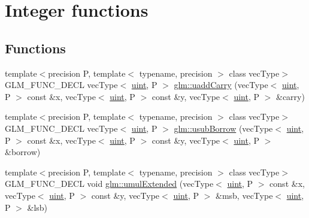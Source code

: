 \hypertarget{group__core__func__integer}{}\section{Integer functions}
\label{group__core__func__integer}
\subsection*{Functions}
\begin{DoxyCompactItemize}
\item 
{\footnotesize template$<$precision P, template$<$ typename, precision $>$ class vec\+Type$>$ }\\G\+L\+M\+\_\+\+F\+U\+N\+C\+\_\+\+D\+E\+CL vec\+Type$<$ \hyperlink{group__core__precision_ga4fd29415871152bfb5abd588334147c8}{uint}, P $>$ \hyperlink{group__core__func__integer_ga2fc1a46e7b7e9fbbd8fa444fbacaa2aa}{glm\+::uadd\+Carry} (vec\+Type$<$ \hyperlink{group__core__precision_ga4fd29415871152bfb5abd588334147c8}{uint}, P $>$ const \&x, vec\+Type$<$ \hyperlink{group__core__precision_ga4fd29415871152bfb5abd588334147c8}{uint}, P $>$ const \&y, vec\+Type$<$ \hyperlink{group__core__precision_ga4fd29415871152bfb5abd588334147c8}{uint}, P $>$ \&carry)
\item 
{\footnotesize template$<$precision P, template$<$ typename, precision $>$ class vec\+Type$>$ }\\G\+L\+M\+\_\+\+F\+U\+N\+C\+\_\+\+D\+E\+CL vec\+Type$<$ \hyperlink{group__core__precision_ga4fd29415871152bfb5abd588334147c8}{uint}, P $>$ \hyperlink{group__core__func__integer_ga22a889bf08313b7e547e2cdb8bb15ee4}{glm\+::usub\+Borrow} (vec\+Type$<$ \hyperlink{group__core__precision_ga4fd29415871152bfb5abd588334147c8}{uint}, P $>$ const \&x, vec\+Type$<$ \hyperlink{group__core__precision_ga4fd29415871152bfb5abd588334147c8}{uint}, P $>$ const \&y, vec\+Type$<$ \hyperlink{group__core__precision_ga4fd29415871152bfb5abd588334147c8}{uint}, P $>$ \&borrow)
\item 
{\footnotesize template$<$precision P, template$<$ typename, precision $>$ class vec\+Type$>$ }\\G\+L\+M\+\_\+\+F\+U\+N\+C\+\_\+\+D\+E\+CL void \hyperlink{group__core__func__integer_ga456ff9dcec42f6769a9ae2a2af7f1ce1}{glm\+::umul\+Extended} (vec\+Type$<$ \hyperlink{group__core__precision_ga4fd29415871152bfb5abd588334147c8}{uint}, P $>$ const \&x, vec\+Type$<$ \hyperlink{group__core__precision_ga4fd29415871152bfb5abd588334147c8}{uint}, P $>$ const \&y, vec\+Type$<$ \hyperlink{group__core__precision_ga4fd29415871152bfb5abd588334147c8}{uint}, P $>$ \&msb, vec\+Type$<$ \hyperlink{group__core__precision_ga4fd29415871152bfb5abd588334147c8}{uint}, P $>$ \&lsb)

\end{DoxyCompactItemize}
